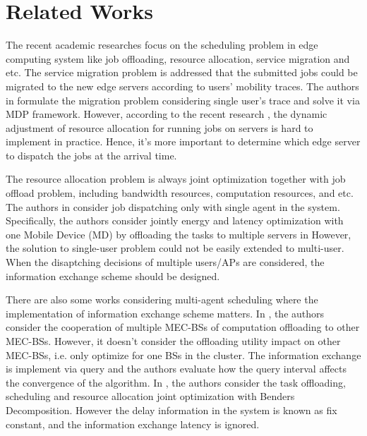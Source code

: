 \section{Related Works}
\label{sec:review}
The recent academic researches focus on the scheduling problem in edge computing system like job offloading, resource allocation, service migration and etc.
The service migration problem is addressed that the submitted jobs could be migrated to the new edge servers according to users' mobility traces.
The authors in \cite{TON19-WangSq} formulate the migration problem considering single user's trace and solve it via MDP framework.
However, according to the recent research \cite{INFOCOM19-WuC}, the dynamic adjustment of resource allocation for running jobs on servers is hard to implement in practice.
Hence, it's more important to determine which edge server to dispatch the jobs at the arrival time.

The resource allocation problem is always joint optimization together with job offload problem, including bandwidth resources, computation resources, and etc.
The authors in \cite{TOC17-DinhTQ} consider job dispatching only with single agent in the system.
Specifically, the authors consider jointly energy and latency optimization with one Mobile Device (MD) by offloading the tasks to multiple servers in \cite{TOC17-DinhTQ}
However, the solution to single-user problem could not be easily extended to multi-user.
When the disaptching decisions of multiple users/APs are considered, the information exchange scheme should be designed.

There are also some works considering multi-agent scheduling where the implementation of information exchange scheme matters.
In \cite{Fan2017}, the authors consider the cooperation of multiple MEC-BSs of computation offloading to other MEC-BSs. However, it doesn't consider the offloading utility impact on other MEC-BSs, i.e. only optimize for one BSs in the cluster.
The information exchange is implement via query and the authors evaluate how the query interval affects the convergence of the algorithm.
In \cite{JSAC19-AlameddineHA}, the authors consider the task offloading, scheduling and resource allocation joint optimization with Benders Decomposition.
However the delay information in the system is known as fix constant, and the information exchange latency is ignored.

